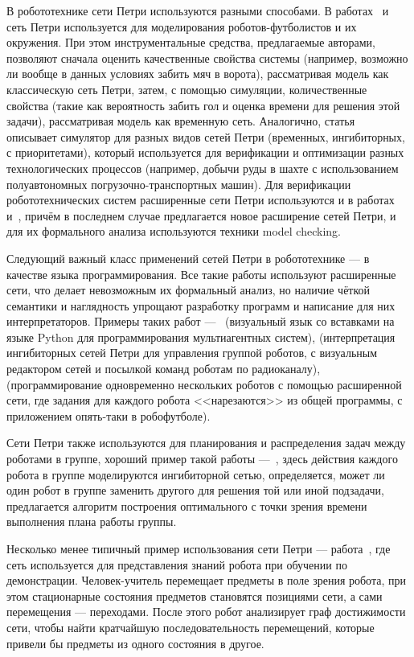 \documentclass[a4, 14pt]{article}
\begin{document}
В робототехнике сети Петри используются разными способами. В работах~\cite{costelha2003petri}
и~\cite{costelha2010petri} сеть Петри используется для моделирования 
роботов-футболистов и их окружения. При этом инструментальные средства, предлагаемые 
авторами, позволяют сначала оценить качественные свойства системы (например, 
возможно ли вообще в данных условиях забить мяч в ворота), рассматривая модель 
как классическую сеть Петри, затем, с помощью симуляции, количественные свойства 
(такие как вероятность забить гол и оценка времени для решения этой задачи), 
рассматривая модель как временную сеть. Аналогично, статья~\cite{konukh2009imitation} 
описывает симулятор для разных видов сетей Петри (временных, ингибиторных, 
с приоритетами), который используется для верификации и оптимизации разных 
технологических процессов (например, добычи руды в шахте с использованием 
полуавтономных погрузочно-транспортных машин). Для верификации робототехнических 
систем расширенные сети Петри используются и в работах~\cite{aguiar2010petri} 
и~\cite{fu2014reconfigurable}, причём в последнем случае предлагается новое 
расширение сетей Петри, и для их формального анализа используются техники 
model checking.

Следующий важный класс применений сетей Петри в робототехнике --- в качестве 
языка программирования. Все такие работы используют расширенные сети, что делает 
невозможным их формальный анализ, но наличие чёткой семантики и наглядность 
упрощают разработку программ и написание для них интерпретаторов. Примеры таких 
работ ---~\cite{simon2010pytri} (визуальный язык со вставками на языке Python 
для программирования мультиагентных систем), \cite{kashima2001mobile} (интерпретация 
ингибиторных сетей Петри для управления группой роботов, с визуальным редактором 
сетей и посылкой команд роботам по радиоканалу), \cite{palamara2008soccer} 
(программирование одновременно нескольких роботов с помощью расширенной сети, 
где задания для каждого робота <<нарезаются>> из общей программы, с приложением 
опять-таки в робофутболе). 

Сети Петри также используются для планирования и распределения задач между 
роботами в группе, хороший пример такой работы ---~\cite{kotb2007multiagent}, 
здесь действия каждого робота в группе моделируются ингибиторной сетью, 
определяется, может ли один робот в группе заменить другого для решения той или 
иной подзадачи, предлагается алгоритм построения оптимального с точки зрения 
времени выполнения плана работы группы.

Несколько менее типичный пример использования сети Петри --- работа~\cite{chang2013learning},
где сеть используется для представления знаний робота при обучении по 
демонстрации. Человек-учитель перемещает предметы в поле зрения 
робота, при этом стационарные состояния предметов становятся позициями сети, 
а сами перемещения --- переходами. После этого робот анализирует граф 
достижимости сети, чтобы найти кратчайшую последовательность перемещений, которые 
привели бы предметы из одного состояния в другое.
\end{document}
